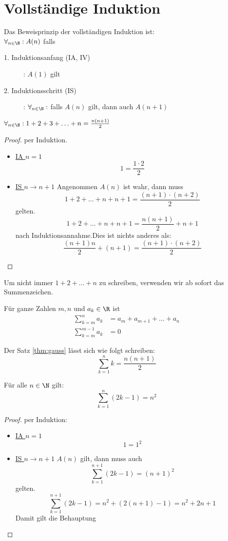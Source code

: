 \section{Vollständige Induktion}
Das Beweisprinzip der vollständigen Induktion ist: \\
$\forall_{n \in \N}: A(n) $ falls 
\begin{description}
	\item [1. Induktionsanfang (IA, IV)]: $A(1)$ gilt
	\item [2. Induktionsschritt (IS)] : $\forall_{n \in \N}: $ falls $A(n)$ gilt, dann auch $A(n+1)$ 
\end{description}
\begin{theorem}
	\label{thm:gauss}
	$\forall_{n \in \N}: 1+2+3+ \ldots + n = \frac{n(n+1)}{2} $ 
\end{theorem}
\begin{proof}
per Induktion.
\begin{itemize}[label=$\lozenge$, itemsep=2ex]
	\item \underline{IA $n=1$}
		\[
		1 = \frac{1 \cdot 2}{2}
		\]
	\item \underline{IS $n \to n+1$} Angenommen $A(n)$ ist wahr, dann muss
		\[
		1+2+\ldots+n + n +1 = \frac{(n+1)\cdot (n+2)}{2}
		\]
		gelten.
		\[
		1+2+\ldots+n+n+1= \frac{n(n+1)}{2}+n+1
		\]
		nach Induktionsannahme.Dies ist nichts anderes als:
		\[
			\frac{(n+1)n}{2}+(n+1) = \frac{(n+1)\cdot (n+2)}{2}
		\]
\end{itemize}
\end{proof}
Um nicht immer $1+2+\ldots+n$ zu schreiben, verwenden wir ab sofort das Summenzeichen.
\begin{notation}
Für ganze Zahlen $m,n$ und $a_k \in \R$ ist 
\begin{align*}
	\sum_{k=m}^{n}a_k &= a_m +a_{m+1} + \ldots + a_n \\
	\sum_{k=m}^{m-1}a_k &= 0
\end{align*}
\end{notation}
\begin{example} Der Satz \ref{thm:gauss} lässt sich wie folgt schreiben:
\[
\sum_{k=1}^{n}k = \frac{n(n+1)}{2}
\]
\end{example}
\begin{theorem}
	Für alle $n \in \N$ gilt:
	\[
	\sum_{k=1}^{n}(2k-1) = n^2
	\]
\end{theorem}
\begin{proof}
per Induktion:

\begin{itemize}[label=$\lozenge$, itemsep=2ex]
	\item \underline{IA $n=1$}
		\[
		1 = 1^2
		\]
	\item \underline{IS $n \to n+1$} $A(n)$ gilt, dann muss auch
		\[
		\sum_{k=1}^{n+1}(2k-1) = (n+1)^2
		\]
		gelten.
		\[
		\sum_{k=1}^{n+1}(2k-1)=n^2+(2(n+1)-1) = n^2+2n+1
		\]
		Damit gilt die Behauptung
\end{itemize}
\end{proof}
